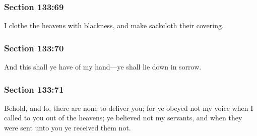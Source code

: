	\subsubsection{Section 133:69} %
		\label{DC133-69}

		I clothe the heavens with blackness, and make sackcloth their covering.


	\subsubsection{Section 133:70} %
		\label{DC133-70}

		And this shall ye have of my hand---ye shall lie down in sorrow.


	\subsubsection{Section 133:71} %
		\label{DC133-71}

		Behold, and lo, there are none to deliver you; for ye obeyed not my voice when I called to you out of the heavens; ye believed not my servants, and when they were sent unto you ye received them not.


